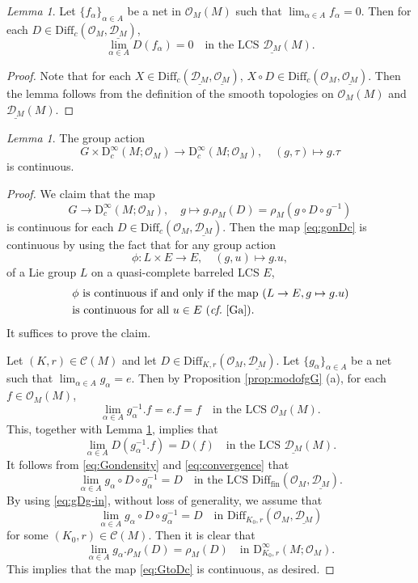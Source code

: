 \documentclass[12pt, a4paper]{amsart}
\newcommand{\CO}{{\mathcal {O}}}
\newcommand{\RD}{{\mathrm {D}}}
\newcommand{\be}{\begin {equation}}
\newcommand{\ee}{\end {equation}}
\newcommand{\cf}{\textit{cf.}~}
\theoremstyle{Theorem}
\theoremstyle{Theorem}
\theoremstyle{Theorem}
\theoremstyle{Theorem}
\theoremstyle{Plain}
\theoremstyle{remark}
\theoremstyle{remark}
\theoremstyle{Definition}
\newtheorem{lemd}[dfn]{Lemma}
\numberwithin{equation}{section}
\begin{document}
\begin{lemd}\label{lem:Df_i}
    Let $\{f_\alpha\}_{\alpha\in A}$ be a net in $\CO_M(M)$ such that $\lim_{\alpha\in A} f_{\alpha}=0$. Then for each $D\in \mathrm{Diff}_c(\CO_M,\underline{\mathcal{D}_M})$,
    \[\lim_{\alpha\in A} D(f_{\alpha})=0 \quad\text{in the LCS $\underline{\mathcal{D}_M}(M)$.}\]
\end{lemd}
\begin{proof}
    Note that for each $X\in \mathrm{Diff}_c(\underline{\mathcal{D}_M},\underline{\CO_M})$, $X\circ D\in\mathrm{Diff}_c(\CO_M,\underline {\CO_M}) $. Then the lemma follows from the definition of the smooth topologies on $\CO_M(M)$ and $\underline{\mathcal{D}_M}(M)$.
\end{proof}
\begin{lemd}\label{lem:gonDc}
    The group action  \be \label{eq:gonDc}G\times \RD^{\infty}_c(M;\CO_M)\rightarrow \RD^{\infty}_c(M;\CO_M),\quad (g,\tau)\mapsto g.\tau\ee is  continuous. 
\end{lemd}
\begin{proof}
 We claim that the map
\be \label{eq:GtoDc}G\rightarrow \RD^{\infty}_c(M;\CO_M),\quad g\mapsto g.\rho_M(D)=\rho_M(g\circ D\circ g^{-1})\ee is continuous for each $D\in \mathrm{Diff}_c(\CO_M,\underline{\mathcal{D}_M})$. Then
the map \eqref{eq:gonDc} is continuous by using the fact that for any group action \[\phi: L\times E \to E,\quad (g,u)\mapsto g.u,\] of a Lie group $L$ on a quasi-complete barreled LCS $E$,  
\be\label{eq:barreled}
\begin{aligned}
&\phi \text{ is continuous if and only if the map $(L\rightarrow E, g\mapsto g.u)$}  \\ & \text{is continuous for all $u\in E$ (\cf\cite[Page 219]{Ga}).}
\end{aligned}
\ee
It suffices to prove the claim.

Let $(K,r)\in \mathcal{C}(M)$ and let $D\in \mathrm{Diff}_{K,r}(\CO_M,\underline{\mathcal{D}_M})$. Let $\{g_\alpha\}_{\alpha\in A}$ be a net such that $\lim_{\alpha\in A} g_\alpha=e$. Then by Proposition \ref{prop:modofgG} (a),  for each $f\in \CO_M(M)$, \[\lim_{\alpha\in A}g^{-1}_\alpha.f=e.f=f\quad \text{in the LCS $\CO_M(M)$.}\]
This, together with  Lemma \ref{lem:Df_i}, implies that  
\[\lim_{\alpha\in A}D(g_{\alpha}^{-1}.f)=D(f)\quad \text{in the LCS $\underline{\mathcal{D}_M}(M)$}.\] It follows from \eqref{eq:Gondensity} and \eqref{eq:convergence} that 
\[\lim_{\alpha\in A} g_{\alpha}\circ D\circ g^{-1}_{\alpha}=D\quad\text{in the LCS $\mathrm{Diff}_{\mathrm{fin}}(\CO_M,\underline{\mathcal{D}_M})$}.\]
 By using \eqref{eq:gDg-in}, without loss of generality, we assume that 
\[\lim_{\alpha\in A} g_{\alpha}\circ D\circ g^{-1}_{\alpha}=D\quad\text{in $\mathrm{Diff}_{K_0,r}(\CO_M,\underline{\mathcal{D}_M})$}\]
for some $(K_0,r)\in \mathcal{C}(M)$. 
Then it is clear that %
\[\lim_{\alpha\in A} g_\alpha.\rho_M(D)=\rho_M(D) \quad \text{in  $\RD^{\infty}_{K_0,r}(M;\CO_M)$}.\]
This implies that the map \eqref{eq:GtoDc} is continuous, as desired. 
\end{proof}
\end{document}
